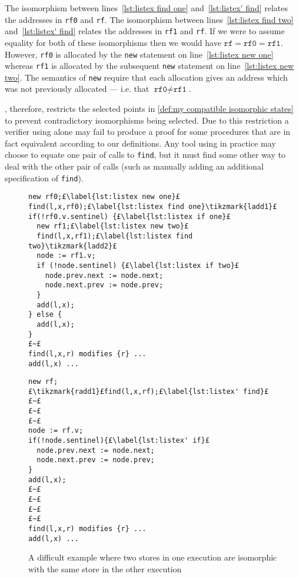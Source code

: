 \documentclass[runningheads,a4paper]{llncs}
\makeatletter
\newcommand{\tikzmark}[1]{\tikz[overlay,remember picture] \node (#1) {};}
\newcommand*{\ie}{i.e.\@\xspace}
\makeatother
\begin{document}
The isomorphism between lines~\ref{lst:listex find one} and~\ref{lst:listex' find} relates the addresses in \texttt{rf0} and \texttt{rf}. The isomorphism between lines~\ref{lst:listex find two} and~\ref{lst:listex' find} relates the addresses in \texttt{rf1} and \texttt{rf}. If we were to assume equality for both of these isomorphisms then we would have $\texttt{rf} = \texttt{rf0} = \texttt{rf1}$. However, \texttt{rf0} is allocated by the \texttt{new} statement on line~\ref{lst:listex new one} whereas \texttt{rf1} is allocated by the subsequent \texttt{new} statement on line~\ref{lst:listex new two}. The semantics of \texttt{new} require that each allocation gives an address which was not previously allocated --- \ie that $\texttt{rf0} \neq \texttt{rf1}$.

\metho{}, therefore, restricts the selected points in \cref{def:my compatible isomorphic states} to prevent contradictory isomorphisms being selected. Due to this restriction a verifier using \metho{} alone may fail to produce a proof for some procedures that are in fact equivalent according to our definitions. Any tool using \metho{} in practice may choose to equate one pair of calls to \texttt{find}, but it must find some other way to deal with the other pair of calls (such as manually adding an additional specification of \texttt{find}). 

\begin{figure}[htbp]
\noindent\begin{minipage}{.48\textwidth}
\begin{lstlisting}[style=bl,name=copyex,firstnumber=auto]
new rf0;£\label{lst:listex new one}£
find(l,x,rf0);£\label{lst:listex find one}\tikzmark{ladd1}£
if(!rf0.v.sentinel) {£\label{lst:listex if one}£ 
  new rf1;£\label{lst:listex new two}£
  find(l,x,rf1);£\label{lst:listex find two}\tikzmark{ladd2}£
  node := rf1.v;
  if (!node.sentinel) {£\label{lst:listex if two}£ 
    node.prev.next := node.next;
    node.next.prev := node.prev; 
  }
  add(l,x);
} else {
  add(l,x);
}
£~£
find(l,x,r) modifies {r} ...
add(l,x) ...
\end{lstlisting}
\end{minipage}%
\begin{minipage}{.48\textwidth}
\begin{lstlisting}[style=bl,name=copyex,firstnumber=auto]
new rf;
£\tikzmark{radd1}£find(l,x,rf);£\label{lst:listex' find}£
£~£
£~£
£~£
node := rf.v;
if(!node.sentinel){£\label{lst:listex' if}£ 
  node.prev.next := node.next;
  node.next.prev := node.prev; 
}
add(l,x);
£~£
£~£
£~£
£~£
find(l,x,r) modifies {r} ...
add(l,x) ...
\end{lstlisting}
\end{minipage}%
\caption{A difficult example where two stores in one execution are isomorphic with the same store in the other execution\label{fig:listex}}%
%
\end{figure}
\end{document}
